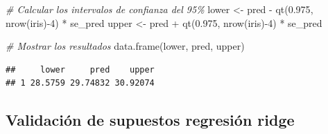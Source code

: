 \documentclass[
]{article}
\newenvironment{Shaded}{\begin{snugshade}}{\end{snugshade}}
\newcommand{\CommentTok}[1]{\textcolor[rgb]{0.56,0.35,0.01}{\textit{#1}}}
\newcommand{\DecValTok}[1]{\textcolor[rgb]{0.00,0.00,0.81}{#1}}
\newcommand{\FloatTok}[1]{\textcolor[rgb]{0.00,0.00,0.81}{#1}}
\newcommand{\FunctionTok}[1]{\textcolor[rgb]{0.00,0.00,0.00}{#1}}
\newcommand{\NormalTok}[1]{#1}
\newcommand{\OtherTok}[1]{\textcolor[rgb]{0.56,0.35,0.01}{#1}}
\newcommand{\SpecialCharTok}[1]{\textcolor[rgb]{0.00,0.00,0.00}{#1}}
\begin{document}
\begin{Shaded}
\begin{Highlighting}[]
\CommentTok{\# Calcular los intervalos de confianza del 95\%}
\NormalTok{lower }\OtherTok{\textless{}{-}}\NormalTok{ pred }\SpecialCharTok{{-}} \FunctionTok{qt}\NormalTok{(}\FloatTok{0.975}\NormalTok{, }\FunctionTok{nrow}\NormalTok{(iris)}\SpecialCharTok{{-}}\DecValTok{4}\NormalTok{) }\SpecialCharTok{*}\NormalTok{ se\_pred}
\NormalTok{upper }\OtherTok{\textless{}{-}}\NormalTok{ pred }\SpecialCharTok{+} \FunctionTok{qt}\NormalTok{(}\FloatTok{0.975}\NormalTok{, }\FunctionTok{nrow}\NormalTok{(iris)}\SpecialCharTok{{-}}\DecValTok{4}\NormalTok{) }\SpecialCharTok{*}\NormalTok{ se\_pred}

\CommentTok{\# Mostrar los resultados}
\FunctionTok{data.frame}\NormalTok{(lower, pred, upper)}
\end{Highlighting}
\end{Shaded}

\begin{verbatim}
##     lower     pred    upper
## 1 28.5759 29.74832 30.92074
\end{verbatim}

\hypertarget{validaciuxf3n-de-supuestos-regresiuxf3n-ridge}{%
\subsection{Validación de supuestos regresión
ridge}\label{validaciuxf3n-de-supuestos-regresiuxf3n-ridge}}
\end{document}

